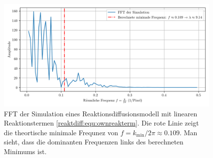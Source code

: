 \begin{figure}
    \centering
    \includegraphics[width=\linewidth]{papers/reaktdiff/images/simpleExample/fft_turing_1d.png}
    \caption{FFT der Simulation eines Reaktionsdiffusionsmodell mit linearen Reaktionstermen \eqref{reaktdiff:equ:ownreakterm}. Die rote Linie zeigt die theortische minimale Frequnez von \(f = k_{\min} / 2 \pi \approx 0.109\). Man sieht, dass die dominanten Frequenzen links des berechneten Minimums ist.}
    \label{reaktdiff:fig:easyfft}
\end{figure}
